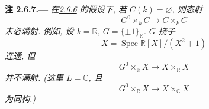 \medskip
{}\label{rem:sga3-VIA-2.6.7}%
\noindent\textbf{注 2.6.7.---}
\textit{在\hyperref[prop:sga3-VIA-2.6.6]{2.6.6} 的假设下,
若 \(C(k)=\varnothing\), 则态射
\[
  G^0\times_kC\longrightarrow C\times_kC
\]
未必满射. 例如, 设 \(k=\mathbb R\), \(G=\{\pm1\}_{\mathbb R}\).
\(G\)-挠子
\[
  X=\operatorname{Spec}\mathbb R[X]/(X^2+1)
\]
连通, 但
\[
  G^0\times_{\mathbb R}X\longrightarrow X\times_{\mathbb R}X
\]
并不满射. (这里 \(L=\mathbb C\), 且
\[
  G^0\times_{\mathbb R}X\longrightarrow X\times_{\mathbb C}X
\]
为同构.)}
